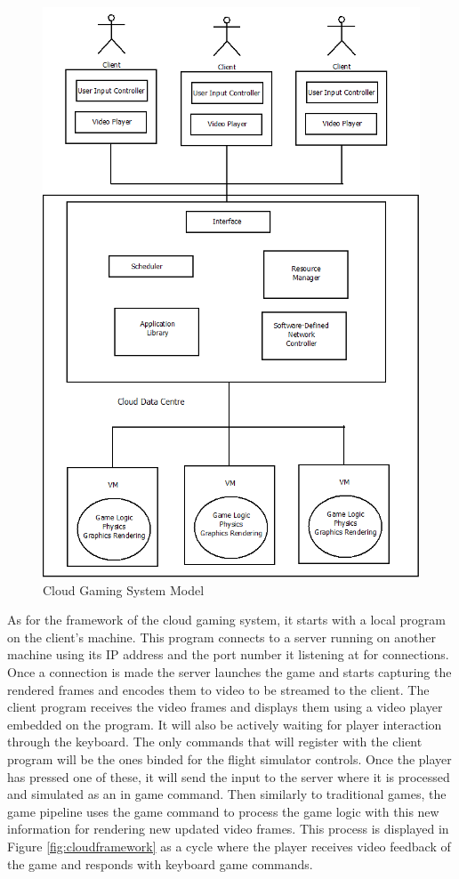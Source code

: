 \clearpage
\begin{figure}[h!]
 \centering
 \includegraphics[width=0.95\linewidth]{images/cloudsystemmodel.png}
 \caption{Cloud Gaming System Model}
 \label{fig:cloudmodel}
\end{figure}
\clearpage
As for the framework of the cloud gaming system, it starts with a local program on the client's machine. This program connects to a server running on another machine using its IP address and the port number it listening at for connections. Once a connection is made the server launches the game and starts capturing the rendered frames and encodes them to video to be streamed to the client. The client program receives the video frames and displays them using a video player embedded on the program. It will also be actively waiting for player interaction through the keyboard. The only commands that will register with the client program will be the ones binded for the flight simulator controls. Once the player has pressed one of these, it will send the input to the server where it is processed and simulated as an in game command. Then similarly to traditional games, the game pipeline uses the game command to process the game logic with this new information for rendering new updated video frames. This process is displayed in Figure \ref{fig:cloudframework} as a cycle where the player receives video feedback of the game and responds with keyboard game commands.
